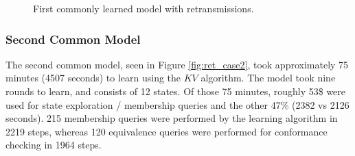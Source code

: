 \begin{figure}[ht]
	\vspace*{\fill}
	\noindent
	\hspace*{-2.1\oddsidemargin}%
	\caption{First commonly learned model with retransmissions.}
	\label{fig:ret_case1}
	\vspace*{\fill}
\end{figure}
\newpage

\subsubsection*{Second Common Model}

The second common model, seen in Figure \ref{fig:ret_case2}, took approximately 75 minutes (4507 seconds) to learn using the $KV$ algorithm. The model took nine rounds to learn, and consists of 12 states. Of those 75 minutes, roughly 53\$ were used for state exploration / membership queries and the other 47\% (2382 vs 2126 seconds). 215 membership queries were performed by the learning algorithm in 2219 steps, whereas 120 equivalence queries were performed for conformance checking in 1964 steps. 

